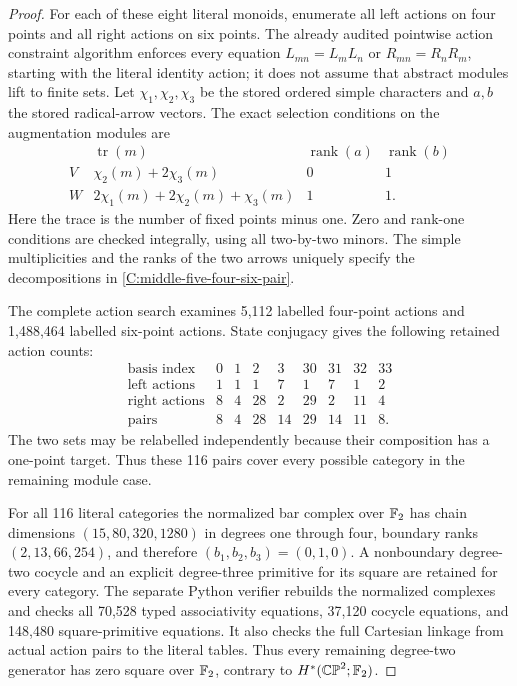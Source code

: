 \begin{proof}
For each of these eight literal monoids, enumerate all left actions on
four points and all right actions on six points.  The already audited
pointwise action constraint algorithm enforces every equation
$L_{mn}=L_mL_n$ or $R_{mn}=R_nR_m$, starting with the literal identity
action; it does not assume that abstract modules lift to finite sets.
Let $\chi_1,\chi_2,\chi_3$ be the stored ordered simple characters and
$a,b$ the stored radical-arrow vectors.  The exact selection conditions
on the augmentation modules are
\[
 \begin{array}{c|c|c|c}
 &\operatorname{tr}(m)&\operatorname{rank}(a)&\operatorname{rank}(b)\\\hline
 V&\chi_2(m)+2\chi_3(m)&0&1\\
 W&2\chi_1(m)+2\chi_2(m)+\chi_3(m)&1&1.
 \end{array}
\]
Here the trace is the number of fixed points minus one.  Zero and
rank-one conditions are checked integrally, using all two-by-two minors.
The simple multiplicities and the ranks of the two arrows uniquely
specify the decompositions in \eqref{C:middle-five-four-six-pair}.

The complete action search examines 5,112 labelled four-point actions
and 1,488,464 labelled six-point actions.  State conjugacy gives the
following retained action counts:
\[
 \begin{array}{c|rrrrrrrr}
 \text{basis index}&0&1&2&3&30&31&32&33\\\hline
 \text{left actions}&1&1&1&7&1&7&1&2\\
 \text{right actions}&8&4&28&2&29&2&11&4\\
 \text{pairs}&8&4&28&14&29&14&11&8.
 \end{array}
\]
The two sets may be relabelled independently because their composition
has a one-point target.  Thus these 116 pairs cover every possible
category in the remaining module case.

For all 116 literal categories the normalized bar complex over $\mathbb F_2$
has chain dimensions $(15,80,320,1280)$ in degrees one through four,
boundary ranks $(2,13,66,254)$, and therefore
$(b_1,b_2,b_3)=(0,1,0)$.  A nonboundary degree-two cocycle and an explicit
degree-three primitive for its square are retained for every category.
The separate Python verifier rebuilds the normalized complexes and
checks all 70,528 typed associativity equations, 37,120 cocycle equations,
and 148,480 square-primitive equations.  It also checks the full
Cartesian linkage from actual action pairs to the literal tables.
Thus every remaining degree-two generator has zero square over $\mathbb F_2$,
contrary to $H^*(\mathbb {CP}^2;\mathbb F_2)$.
\end{proof}

